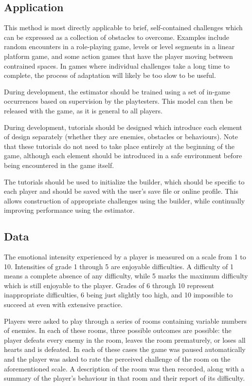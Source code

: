 \documentclass[a4paper]{article}
\begin{document}
\begin{multicols*}{2}
\subsection{Application}
This method is most directly applicable to brief, self-contained challenges which can be expressed as a collection of obstacles to overcome. Examples include random encounters in a role-playing game, levels or level segments in a linear platform game, and some action games that have the player moving between contrained spaces. In games where individual challenges take a long time to complete, the process of adaptation will likely be too slow to be useful.

During development, the estimator should be trained using a set of in-game occurrences based on supervision by the playtesters. This model can then be released with the game, as it is general to all players. 

During development, tutorials should be designed which introduce each element of design separately (whether they are enemies, obstacles or behaviours). Note that these tutorials do not need to take place entirely at the beginning of the game, although each element should be introduced in a safe environment before being encountered in the game itself.

The tutorials should be used to initialize the builder, which should be specific to each player and should be saved with the user's save file or online profile. This allows construction of appropriate challenges using the builder, while continually improving performance using the estimator.

\subsection{Data} \label{data}
The emotional intensity experienced by a player is measured on a scale from 1 to 10. Intensities of grade 1 through 5 are enjoyable difficulties. A difficulty of 1 means a complete absence of any difficulty, while 5 marks the maximum difficulty which is still enjoyable to the player. Grades of 6 through 10 represent inappropriate difficulties, 6 being just slightly too high, and 10 impossible to succeed at even with extensive practice.

Players were asked to play through a series of rooms containing variable numbers of enemies. In each of these rooms, three possible outcomes are possible: the player  defeats every enemy in the room, leaves the room prematurely, or loses all hearts and is defeated. In each of these cases the game was paused automatically and the player was asked to rate the perceived challenge of the room on the aforementioned scale. A description of the room was then recorded, along with a summary of the player's behaviour in that room and their report of its difficulty.


\end{multicols*}
\end{document}
